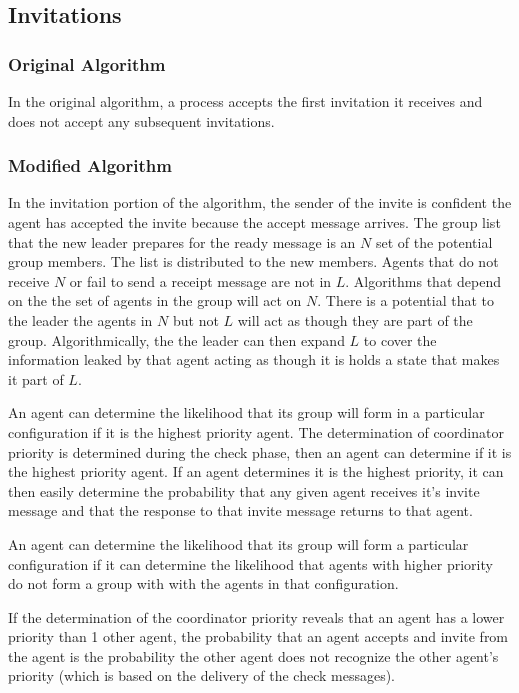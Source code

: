 \subsection{Invitations}

\subsubsection{Original Algorithm}

In the original algorithm, a process accepts the first invitation it receives and does not accept any subsequent invitations.

\subsubsection{Modified Algorithm}

In the invitation portion of the algorithm, the sender of the invite is confident the agent has accepted the invite because the accept message arrives. The group list that the new leader prepares for the ready message is an $N$ set of the potential group members. The list is distributed to the new members. Agents that do not receive $N$ or fail to send a receipt message are not in $L$. Algorithms that depend on the the set of agents in the group will act on $N$. There is a potential that to the leader the agents in $N$ but not $L$ will act as though they are part of the group. Algorithmically, the the leader can then expand $L$ to cover the information leaked by that agent acting as though it is holds a state that makes it part of $L$.

An agent can determine the likelihood that its group will form in a particular configuration if it is the highest priority agent. The determination of coordinator priority is determined during the check phase, then an agent can determine if it is the highest priority agent. If an agent determines it is the highest priority, it can then easily determine the probability that any given agent receives it's invite message and that the response to that invite message returns to that agent.

An agent can determine the likelihood that its group will form a particular configuration if it can determine the likelihood that agents with higher priority do not form a group with with the agents in that configuration.

If the determination of the coordinator priority reveals that an agent has a lower priority than 1 other agent, the probability that an agent accepts and invite from the agent is the probability the other agent does not recognize the other agent's priority (which is based on the delivery of the check messages).

